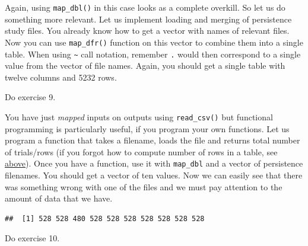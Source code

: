 \documentclass[
]{book}
\begin{document}
Again, using \texttt{map\_dbl()} in this case looks as a complete overkill. So let us do something more relevant. Let us implement loading and merging of persistence study files. You already know how to get a vector with names of relevant files. Now you can use \texttt{map\_dfr()} function on this vector to combine them into a single table. When using \texttt{\textasciitilde{}} call notation, remember \texttt{.} would then correspond to a single value from the vector of file names. Again, you should get a single table with twelve columns and 5232 rows.

Do exercise 9.

You have just \emph{mapped} inputs on outputs using \texttt{read\_csv()} but functional programming is particularly useful, if you program your own functions. Let us program a function that takes a filename, loads the file and returns total number of trials/rows (if you forgot how to compute number of rows in a table, see \protect\hyperlink{forloop}{above}). Once you have a function, use it with \texttt{map\_dbl} and a vector of persistence filenames. You should get a vector of ten values. Now we can easily see that there was something wrong with one of the files and we must pay attention to the amount of data that we have.

\begin{verbatim}
##  [1] 528 528 480 528 528 528 528 528 528 528
\end{verbatim}

Do exercise 10.

  
\end{document}
